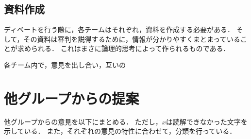 \documentclass[uplatex,a4paper]{jsarticle}
\begin{document}
\subsection{資料作成}
ディベートを行う際に，各チームはそれぞれ，資料を作成する必要がある．
そして，その資料は審判を説得するために，情報が分かりやすくまとまっていることが求められる．
これはまさに論理的思考によって作られるものである．

各チーム内で，意見を出し合い，互いの



\section{他グループからの提案}
他グループからの意見を以下にまとめる．
ただし，$x$は読解できなかった文字を示している．
また，それぞれの意見の特性に合わせて，分類を行っている．
\end{document}
